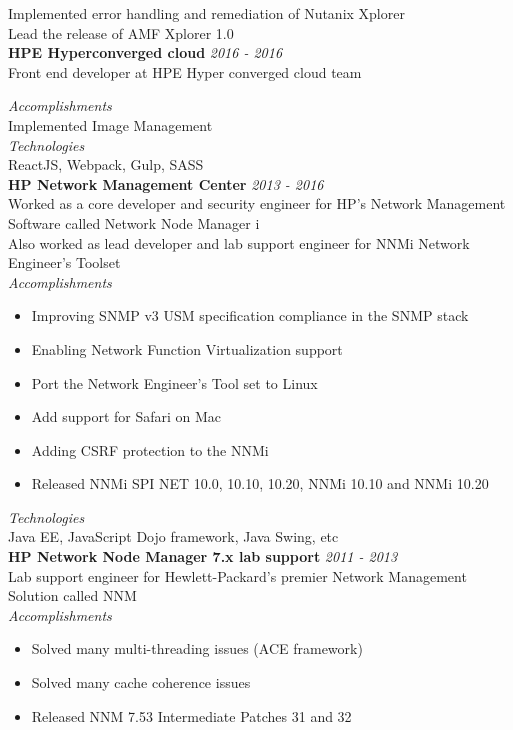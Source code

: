 \documentclass[line,margin]{res}
\begin{document}
\begin{resume}
Implemented error handling and remediation of Nutanix Xplorer\\
Lead the release of AMF Xplorer 1.0\\

{\bf HPE Hyperconverged cloud} \hfill {\it{2016 - 2016}}\\
Front end developer at HPE Hyper converged cloud team

{\it{Accomplishments}}\\
Implemented Image Management\\

{\it{Technologies}}\\
ReactJS, Webpack, Gulp, SASS\\


{\bf HP Network Management Center} \hfill {\it{2013 - 2016}}\\
Worked as a core developer and security engineer for HP's Network Management Software called Network Node Manager i\\
Also worked as lead developer and lab support engineer for NNMi Network Engineer's Toolset\\

{\it{Accomplishments}}\\
\begin{itemize}
\item Improving SNMP v3 USM specification compliance in the SNMP stack
\item Enabling Network Function Virtualization support
\item Port the Network Engineer's Tool set to Linux
\item Add support for Safari on Mac
\item Adding CSRF protection to the NNMi
\item Released NNMi SPI NET 10.0, 10.10, 10.20, NNMi 10.10 and NNMi 10.20
\end{itemize}

{\it{Technologies}}\\
Java EE, JavaScript Dojo framework, Java Swing, etc\\

{\bf HP Network Node Manager 7.x lab support} \hfill {\it{2011 - 2013}}\\
Lab support engineer for Hewlett-Packard's premier Network Management Solution called NNM\\

{\it{Accomplishments}}\\
\begin{itemize}
\item Solved many multi-threading issues (ACE framework)
\item Solved many cache coherence issues
\item Released NNM 7.53 Intermediate Patches 31 and 32
\end{itemize}



\end{resume}
\end{document}
